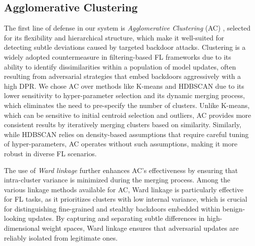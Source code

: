 \subsection{Agglomerative Clustering}  
\label{subsec:agglo_clustering}  

The first line of defense in our system is \textit{Agglomerative Clustering} (AC) \citep{müllner2011modernhierarchicalagglomerativeclustering}, selected for its flexibility and hierarchical structure, which make it well-suited for detecting subtle deviations caused by targeted backdoor attacks. Clustering is a widely adopted countermeasure in filtering-based FL frameworks \citep{nguyen2022flame, fung2018mitigating, baybfed, mesas, auror} due to its ability to identify dissimilarities within a population of model updates, often resulting from adversarial strategies that embed backdoors aggressively with a high DPR. We chose AC over methods like K-means and HDBSCAN due to its lower sensitivity to hyper-parameter selection and its dynamic merging process, which eliminates the need to pre-specify the number of clusters. Unlike K-means, which can be sensitive to initial centroid selection and outliers, AC provides more consistent results by iteratively merging clusters based on similarity. Similarly, while HDBSCAN \citep{campello2013density} relies on density-based assumptions that require careful tuning of hyper-parameters, AC operates without such assumptions, making it more robust in diverse FL scenarios.

The use of \textit{Ward linkage} \citep{Ward01031963} further enhances AC's effectiveness by ensuring that intra-cluster variance is minimized during the merging process. Among the various linkage methods available for AC, Ward linkage is particularly effective for FL tasks, as it prioritizes clusters with low internal variance, which is crucial for distinguishing fine-grained and stealthy backdoors embedded within benign-looking updates. By capturing and separating subtle differences in high-dimensional weight spaces, Ward linkage ensures that adversarial updates are reliably isolated from legitimate ones.  

